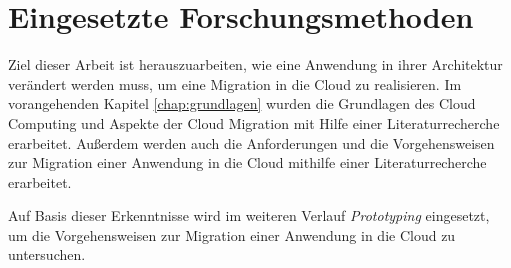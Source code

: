 
\chapter{Eingesetzte Forschungsmethoden}
Ziel dieser Arbeit ist herauszuarbeiten, wie eine Anwendung in ihrer Architektur verändert werden muss, um eine Migration in die Cloud zu realisieren. Im vorangehenden Kapitel \ref{chap:grundlagen} wurden die Grundlagen des Cloud Computing und Aspekte der Cloud Migration mit Hilfe einer Literaturrecherche erarbeitet. Außerdem werden auch die Anforderungen und die Vorgehensweisen zur Migration einer Anwendung in die Cloud mithilfe einer Literaturrecherche erarbeitet.

Auf Basis dieser Erkenntnisse wird im weiteren Verlauf \textit{Prototyping} eingesetzt, um die Vorgehensweisen zur Migration einer Anwendung in die Cloud zu untersuchen.


